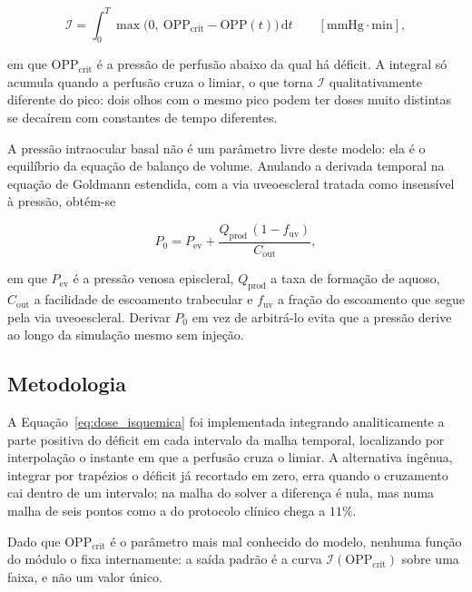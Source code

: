 \begin{equation}
\mathcal{I}=\int_{0}^{T}\max\!\big(0,\ \mathrm{OPP}_{\mathrm{crit}}-\mathrm{OPP}(t)\big)\,\mathrm{d}t
\qquad[\mathrm{mmHg}\cdot\mathrm{min}],
\label{eq:dose_isquemica}
\end{equation}

em que $\mathrm{OPP}_{\mathrm{crit}}$ é a pressão de perfusão abaixo da qual há déficit. A integral só acumula quando a perfusão cruza o limiar, o que torna $\mathcal{I}$ qualitativamente diferente do pico: dois olhos com o mesmo pico podem ter doses muito distintas se decaírem com constantes de tempo diferentes.

A pressão intraocular basal não é um parâmetro livre deste modelo: ela é o equilíbrio da equação de balanço de volume. Anulando a derivada temporal na equação de Goldmann estendida, com a via uveoescleral tratada como insensível à pressão, obtém-se

\begin{equation}
P_{0}=P_{\mathrm{ev}}+\frac{Q_{\mathrm{prod}}\,(1-f_{\mathrm{uv}})}{C_{\mathrm{out}}},
\label{eq:p0_equilibrio}
\end{equation}

em que $P_{\mathrm{ev}}$ é a pressão venosa episcleral, $Q_{\mathrm{prod}}$ a taxa de formação de aquoso, $C_{\mathrm{out}}$ a facilidade de escoamento trabecular e $f_{\mathrm{uv}}$ a fração do escoamento que segue pela via uveoescleral. Derivar $P_0$ em vez de arbitrá-lo evita que a pressão derive ao longo da simulação mesmo sem injeção.

\subsection{Metodologia}

A Equação~\ref{eq:dose_isquemica} foi implementada integrando analiticamente a parte positiva do déficit em cada intervalo da malha temporal, localizando por interpolação o instante em que a perfusão cruza o limiar. A alternativa ingênua, integrar por trapézios o déficit já recortado em zero, erra quando o cruzamento cai dentro de um intervalo; na malha do solver a diferença é nula, mas numa malha de seis pontos como a do protocolo clínico chega a $11\%$.

Dado que $\mathrm{OPP}_{\mathrm{crit}}$ é o parâmetro mais mal conhecido do modelo, nenhuma função do módulo o fixa internamente: a saída padrão é a curva $\mathcal{I}(\mathrm{OPP}_{\mathrm{crit}})$ sobre uma faixa, e não um valor único.

